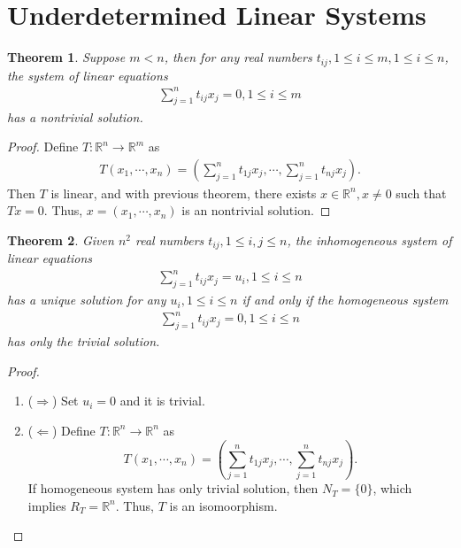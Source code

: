 \documentclass[11pt]{book}
\newtheorem{theorem}{Theorem}[chapter]
\theoremstyle{definition}
\numberwithin{equation}{chapter}
\begin{document}
\medskip

\section{Underdetermined Linear Systems}
\begin{theorem}
Suppose $m < n$, then for any real numbers $t_{ij}, 1\leq i\leq m, 1\leq i\leq n$, the system of linear equations
\begin{align*}
    \sum^n_{j=1}t_{ij} x_j = 0, 1\leq i \leq m
\end{align*}
has a nontrivial solution.
\end{theorem}
\begin{proof}
Define $T:\mathbb{R}^n\to\mathbb{R}^m$ as
\begin{align*}
    T(x_1,\cdots,x_n) = \left(\sum^n_{j=1}t_{1j} x_j, \cdots, \sum^n_{j=1}t_{nj} x_j\right).
\end{align*}
Then $T$ is linear, and with previous theorem, there exists $x\in\mathbb{R}^n, x\neq 0$ such that $T x = 0$. Thus, $x = (x_1,\cdots,x_n)$ is an nontrivial solution.
\end{proof}

\medskip

\begin{theorem}
Given $n^2$ real numbers $t_{ij}, 1\leq i,j\leq n$, the inhomogeneous system of linear equations
\begin{align*}
    \sum^n_{j=1}t_{ij} x_j = u_i, 1\leq i \leq n
\end{align*}
has a unique solution for any $u_i, 1\leq i \leq n$ if and only if the homogeneous system
\begin{align*}
    \sum^n_{j=1}t_{ij} x_j = 0, 1\leq i \leq n
\end{align*}
has only the trivial solution.
\end{theorem}
\begin{proof}
~\begin{enumerate}[label=(\arabic*)]
    \item ($\Rightarrow$) Set $u_i = 0$ and it is trivial.
    \item ($\Leftarrow$) Define $T:\mathbb{R}^n\to\mathbb{R}^n$ as 
    $$T(x_1,\cdots,x_n) = \left(\sum^n_{j=1}t_{1j} x_j, \cdots, \sum^n_{j=1}t_{nj} x_j\right).$$
    If homogeneous system has only trivial solution, then $N_T = \{0\}$, which implies $R_T = \mathbb{R}^n$. Thus, $T$ is an isomoorphism. 
\end{enumerate}
\end{proof}
\end{document}
